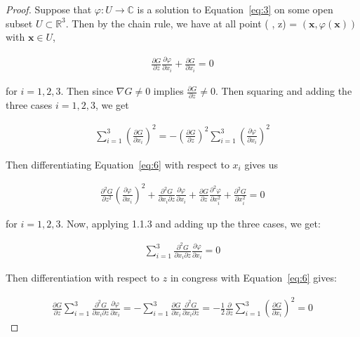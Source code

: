 \documentclass[12pt]{article}
\theoremstyle{definition}
\numberwithin{equation}{subsection}
\begin{document}
\begin{proof}
Suppose that $\varphi : U \rightarrow \mathbb{C}$ is a solution to Equation~\ref{eq:3} on some open subset $U \subset \mathbb{R}^3$. Then by the chain rule, we have at all point ( , z) = $(\boldsymbol{x} , \varphi(\boldsymbol{x}))$ with $\boldsymbol{x} \in U$,

\begin{align}\label{eq:6}
    \frac{\partial G}{\partial z} \frac{\partial\varphi}{\partial x_i} + \frac{\partial G}{\partial x_i} = 0
\end{align}

for $i=1 , 2 , 3$. Then since $\nabla G \neq 0 $ implies $\frac{\partial G}{ \partial z} \neq 0$. Then squaring and adding the three cases $i = 1 , 2, 3$, we get

\begin{align}\label{eq:7}
    \sum_{i=1}^3 \left(\frac{\partial G}{ \partial x_i} \right)^2 = - \left(\frac{\partial G}{\partial z}  \right)^2 \sum_{i=1}^3 \left(\frac{\partial \varphi}{ \partial x_i} \right)^2
\end{align}

Then differentiating Equation~\ref{eq:6} with respect to $x_i$ gives us 

\begin{align}\label{eq:8}
    \frac{\partial^2 G}{\partial z^2}\left(\frac{\partial \varphi}{\partial x_i}\right)^2 + \frac{\partial^2 G}{\partial x_i \partial z}\frac{\partial \varphi}{\partial x_i} + \frac{\partial G}{ \partial z} \frac{\partial^2 \varphi}{\partial x_i^2} + \frac{\partial^2 G}{\partial x_i^2} = 0
\end{align}

for $i=1,2,3$. Now, applying 1.1.3 and adding up the three cases, we get:

\begin{align}\label{eq:9}
    \sum_{i=1}^3 \frac{\partial^2 G}{\partial x_i \partial z}\frac{\partial \varphi}{\partial x_i} = 0
\end{align}

Then differentiation with respect to $z$ in congress with Equation~\ref{eq:6} gives:

\begin{align}\label{eq:10}
\frac{\partial G}{ \partial z}\sum_{i=1}^3 \frac{\partial^2 G}{\partial x_i \partial z}\frac{\partial \varphi}{\partial x_i} = -\sum_{i=1}^3 \frac{\partial G}{\partial x_i}\frac{\partial^2 G}{\partial x_i \partial z}
=-\frac{1}{2}\frac{\partial}{\partial z} \sum_{i=1}^3 \left(\frac{\partial G}{\partial x_i}  \right)^2 =0
\end{align} 


\end{proof}
\end{document}
